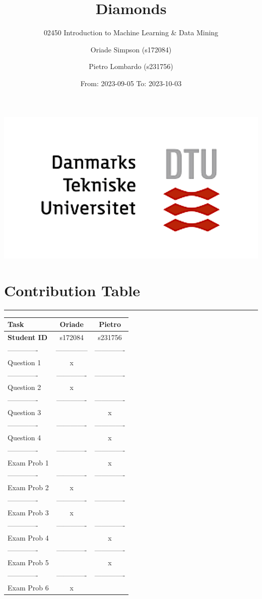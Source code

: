 \documentclass[
]{article}
\title{Diamonds}
\subtitle{02450 Introduction to Machine Learning \& Data Mining}
\author{Oriade Simpson (s172084) \and Pietro Lombardo (s231756)}
\date{From: 2023-09-05 To: 2023-10-03}
\begin{document}
\maketitle

\begin{center}\includegraphics[width=0.4\linewidth]{Images/Universe2} \end{center}

\newpage
\newpage 
\newpage
\newpage 
\newpage
\newpage 
\newpage
\newpage
\newpage 
\newpage
\newpage 
\newpage
\newpage
\newpage
\newpage
\newpage

\section{Contribution Table}\label{contribution-table}

\begin{center}\rule{0.5\linewidth}{0.5pt}\end{center}

\begin{longtable}[]{@{}lcc@{}}
\toprule\noalign{}
Task & Oriade & Pietro \\
\midrule\noalign{}
\endhead
\bottomrule\noalign{}
\endlastfoot
\textbf{Student ID} & s172084 & s231756 \\
------------- & -------------- & ------------- \\
Question 1 & x & \\
------------- & ------------- & ------------- \\
Question 2 & x & \\
------------- & ------------- & ------------- \\
Question 3 & & x \\
------------- & ------------- & ------------- \\
Question 4 & & x \\
------------- & ------------- & ------------- \\
Exam Prob 1 & & x \\
------------- & ------------- & ------------- \\
Exam Prob 2 & x & \\
------------- & ------------- & ------------- \\
Exam Prob 3 & x & \\
------------- & ------------- & ------------- \\
Exam Prob 4 & & x \\
------------- & ------------- & ------------- \\
Exam Prob 5 & & x \\
------------- & ------------- & ------------- \\
Exam Prob 6 & x & \\
\end{longtable}
\end{document}
